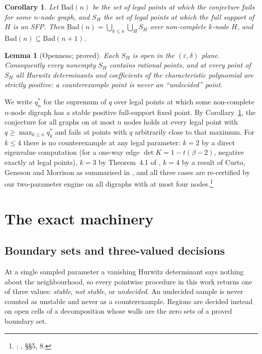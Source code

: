 \documentclass[11pt]{article}
\newtheorem{lemma}[theorem]{Lemma}
\newtheorem{corollary}[theorem]{Corollary}
\theoremstyle{definition}
\newcommand{\eps}{\varepsilon}
\begin{document}
\begin{corollary}\label{cor:monotone}
Let $\mathrm{Bad}(n)$ be the set of legal points at which the conjecture fails for some $n$-node graph, and $S_H$
the set of legal points at which the full support of $H$ is an SFP. Then
$\mathrm{Bad}(n)=\bigcup_{k\le n}\bigcup_{H}S_H$ over non-complete $k$-node $H$, and
$\mathrm{Bad}(n)\subseteq\mathrm{Bad}(n+1)$.
\end{corollary}

\begin{lemma}[Openness; proved]\label{lem:open}
Each $S_H$ is open in the $(\eps,\delta)$ plane. Consequently every nonempty $S_H$ contains rational points,
and at every point of $S_H$ all Hurwitz determinants and coefficients of the characteristic polynomial are
strictly positive: a counterexample point is never an ``undecided'' point.
\end{lemma}

We write $q_n^*$ for the supremum of $q$ over legal points at which some non-complete $n$-node digraph has a
stable positive full-support fixed point. By Corollary~\ref{cor:monotone}, the conjecture for all graphs
on at most $n$ nodes holds at every legal point with $q\ge\max_{k\le n}q_k^*$ and fails at points with $q$
arbitrarily close to that maximum. For $k\le4$ there is no counterexample at any legal parameter: $k=2$ by
a direct eigenvalue computation (for a one-way edge $\det K=1-t(\beta-2)$, negative exactly at legal points), $k=3$ by Theorem~4.1 of \cite{Geneson2026}, $k=4$ by a result of Curto, Geneson and Morrison as
summarised in \cite{Geneson2026}, and all three cases are re-certified by our two-parameter engine on all
digraphs with at most four nodes.\footnote{; , \S\S5, 8.}

\section{The exact machinery}\label{sec:machinery}

\subsection{Boundary sets and three-valued decisions}
At a single sampled parameter a vanishing Hurwitz determinant says nothing about the neighbourhood, so
every pointwise procedure in this work returns one of three values: \emph{stable}, \emph{not stable}, or
\emph{undecided}. An undecided sample is never counted as unstable and never as a counterexample. Regions
are decided instead on open cells of a decomposition whose walls are the zero sets of a proved boundary set.
\end{document}

